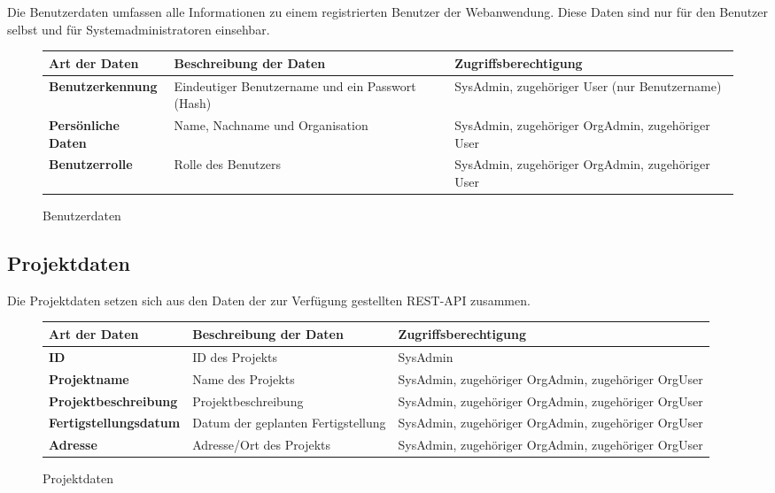 Die Benutzerdaten umfassen alle Informationen zu einem registrierten Benutzer der Webanwendung. Diese Daten sind nur f\"ur den Benutzer selbst und f\"ur Systemadministratoren einsehbar.

\begin{figure}[h]
	\centering
	\begin{tabularx}{\textwidth}{| X || X | X |}
        \hline
		\textbf{Art der Daten} & \textbf{Beschreibung der Daten} & \textbf{Zugriffsberechtigung} \\ \hline \hline
		\textbf{Benutzerkennung} & Eindeutiger Benutzername und ein Passwort (Hash) & SysAdmin, zugehöriger User (nur Benutzername) \\ \hline
		\textbf{Persönliche Daten} & Name, Nachname und Organisation & SysAdmin, zugehöriger OrgAdmin, zugehöriger User \\ \hline
		\textbf{Benutzerrolle} & Rolle des Benutzers & SysAdmin, zugehöriger OrgAdmin, zugehöriger User \\ \hline
	\end{tabularx}
	\caption{Benutzerdaten}
	\label{fig:Benutzerdaten}
\end{figure}

\newpage

\subsection{Projektdaten}

Die Projektdaten setzen sich aus den Daten der zur Verf\"ugung gestellten REST-API zusammen.

\begin{figure}[h]
	\centering
	\begin{tabularx}{\textwidth}{| X || X | X |}
        \hline
		\textbf{Art der Daten} & \textbf{Beschreibung der Daten} & \textbf{Zugriffsberechtigung} \\ \hline \hline
        \textbf{ID} & ID des Projekts & SysAdmin \\ \hline
		\textbf{Projektname} & Name des Projekts & SysAdmin, zugehöriger OrgAdmin, zugehöriger OrgUser \\ \hline
		\textbf{Projektbeschreibung} & Projektbeschreibung & SysAdmin, zugehöriger OrgAdmin, zugehöriger OrgUser \\ \hline
		\textbf{Fertigstellungsdatum} & Datum der geplanten Fertigstellung & SysAdmin, zugehöriger OrgAdmin, zugehöriger OrgUser \\ \hline
        \textbf{Adresse} & Adresse/Ort des Projekts & SysAdmin, zugehöriger OrgAdmin, zugehöriger OrgUser \\ \hline
	\end{tabularx}
	\caption{Projektdaten}
	\label{fig:Projektdaten}
\end{figure}

